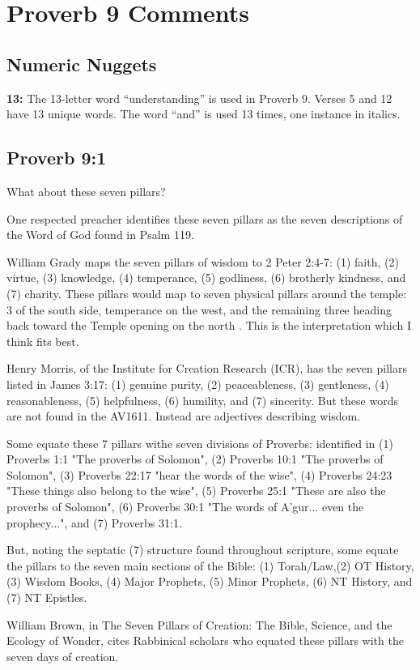 \section{Proverb 9 Comments}

\subsection{Numeric Nuggets}
\textbf{13:} The 13-letter word ``understanding'' is used in Proverb 9. Verses 5 and 12 have 13 unique words. The word ``and'' is used 13 times, one instance in italics.

\subsection{Proverb 9:1}
What about these seven pillars?
\begin{compactenum}
    \item One respected preacher identifies these seven pillars as the seven descriptions of the Word of God found in Psalm 119.
    \item William Grady maps the seven pillars of wisdom to 2 Peter 2:4-7: (1) faith, (2) virtue, (3) knowledge, (4) temperance, (5) godliness, (6) brotherly kindness, and (7) charity. These pillars would map to seven physical pillars around the temple: 3 of the south side, temperance on the west, and the remaining three heading back toward the Temple opening on the north \cite{grady2010given}. This is the interpretation which I think fits best.
    \item Henry Morris, of the Institute for Creation Research (ICR), has the seven pillars listed in James 3:17:  (1) genuine purity, (2) peaceableness, (3) gentleness, (4) reasonableness, (5) helpfulness, (6) humility, and (7) sincerity. But these words are not found in the AV1611.  Instead are adjectives describing wisdom.
    \item Some equate these 7 pillars withe seven divisions of Proverbs: identified in (1) Proverbs 1:1 "The proverbs of Solomon", (2) Proverbs 10:1 "The proverbs of Solomon", (3) Proverbs 22:17 "hear the words of the wise", (4) Proverbs 24:23 "These things also belong to the wise", (5) Proverbs 25:1 "These are also the proverbs of Solomon", (6) Proverbs 30:1 "The words of A'gur... even the prophecy...", and (7) Proverbs 31:1.
    \item But, noting the septatic (7) structure found throughout scripture, some equate the pillars to the seven main sections of the Bible: (1) Torah/Law,(2) OT History, (3) Wisdom Books, (4) Major Prophets, (5) Minor Prophets, (6) NT History, and (7) NT Epistles.
    \item William Brown, in The Seven Pillars of Creation: The Bible, Science, and the Ecology of Wonder, cites Rabbinical scholars who equated these pillars with the seven days of creation. \cite{brown2010SevenPillars}
\end{compactenum}

